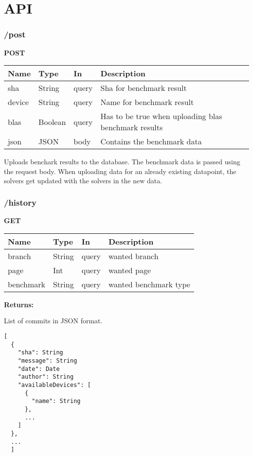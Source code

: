\section{API}


\subsubsection*{/post}

\textbf{POST}

\begin{tabular}{ l l l l }
  Name & Type & In & Description \\ 
  \hline
  sha & String & query & Sha for benchmark result \\
  device & String & query & Name for benchmark result \\
  blas & Boolean & query & Has to be true when uploading blas benchmark results \\
  json & JSON & body & Contains the benchmark data \\
  \hline
\end{tabular}

Uploads benchark results to the database. The benchmark data is passed using the request body. When uploading data for an already existing datapoint, the solvers get updated with the solvers in the new data.

\subsubsection*{/history}

\textbf{GET}

\begin{tabular}{ l l l l }
  Name & Type & In & Description \\ 
  \hline
  branch & String & query & wanted branch \\
  page & Int & query & wanted page \\
  benchmark & String & query & wanted benchmark type \\
  \hline
\end{tabular}

\textbf{Returns: }

List of commits in JSON format.
\begin{lstlisting}
[
  {
    "sha": String
    "message": String
    "date": Date
    "author": String
    "availableDevices": [
      {
        "name": String
      },
      ...
    ]
  },
  ...
  ]
\end{lstlisting}

